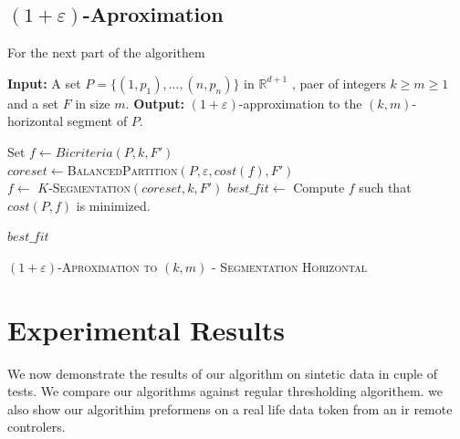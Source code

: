 \documentclass{vldb}
\begin{document}
\subsection{$(1+\varepsilon)$-Aproximation}
For the next part of the algorithem 
\begin{algorithm}
\begin{algorithmic}
\STATE \textbf{Input:} A set $P = \lbrace(1,p_1),...,(n,p_n)\rbrace$ in $ \mathbb{R}^{d+1}$
, paer of integers $k\geq m\geq1$
and a set $F$ in size $m$.
\STATE \textbf{Output:}  $(1+\varepsilon)$-approximation to the $(k,m)$-horizontal segment of $P$.
 

\STATE 
Set $f \gets Bicriteria(P,k,F')$ \\
$coreset \gets $\textsc{BalancedPartition}$(P,\varepsilon,cost(f),F')$\\
$f \gets $ \textsc{$K$-Segmentation$(coreset,k,F')$}
\STATE $best\_fit \gets $ Compute $f$ such that $cost(P,f)$ is minimized.

\ENDFOR

\RETURN $best\_fit$



\caption{\textsc{$(1+\varepsilon)$-Aproximation to $(k,m)$ - Segmentation Horizontal}}

\end{algorithmic}
\end{algorithm}


\section{Experimental Results} \label{Experimental Results}
We now demonstrate the results of our algorithm on sintetic data in cuple of tests. We compare our algorithms against regular thresholding algorithem. we also show our algorithim preformens on a real life data token from an ir remote controlers.
\end{document}
